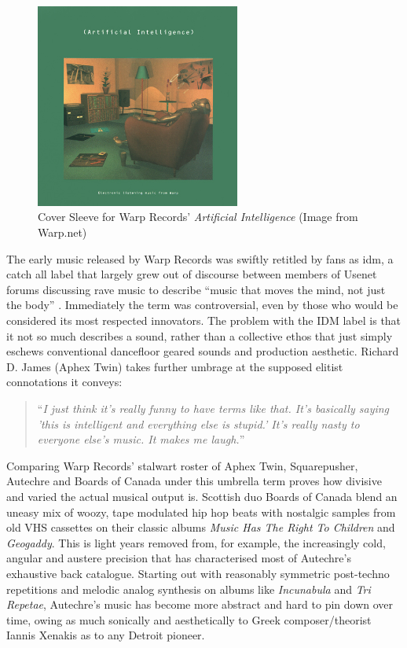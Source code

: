 \begin{figure}
	\begin{center}
		\includegraphics[width=0.6\textwidth]{ch02_dancemusic/figures/warp.jpg}
	\end{center}
	\caption[Cover Sleeve for \textit{Artificial Intelligence} (Warp Records)]{Cover Sleeve for Warp Records' \textit{Artificial Intelligence} (Image from Warp.net)}
	\label{fig:roland}
\end{figure}

The early music released by Warp Records was swiftly retitled by fans as \acrfull{idm}, a catch all label that largely grew out of discourse between members of Usenet forums discussing rave music to describe “music that moves the mind, not just the body” \citep{Alwakeel2009}. Immediately the term was controversial, even by those who would be considered its most respected innovators.  The problem with the IDM label is that it not so much describes a sound, rather than a collective ethos that just simply eschews conventional dancefloor geared sounds and production aesthetic. Richard D. James (Aphex Twin) takes further umbrage at the supposed elitist connotations it conveys:

\blockcquote[]{Haworth2015}{``\textit{I just think it's really funny to have terms like that. It's basically saying 'this is intelligent and everything else is stupid.' It's really nasty to everyone else's music. It makes me laugh.}''}

Comparing Warp Records’ stalwart roster of Aphex Twin, Squarepusher, Autechre and Boards of Canada under this umbrella term proves how divisive and varied the actual musical output is. Scottish duo Boards of Canada blend an uneasy mix of woozy, tape modulated hip hop beats with nostalgic samples from old VHS cassettes on their classic albums \textit{Music Has The Right To Children} and \textit{Geogaddy}. This is light years removed from, for example, the increasingly cold, angular and austere precision that has characterised most of Autechre’s exhaustive back catalogue. Starting out with reasonably symmetric post-techno repetitions and melodic analog synthesis on albums like \textit{Incunabula} and \textit{Tri Repetae}, Autechre’s music has become more abstract and hard to pin down over time, owing as much sonically and aesthetically to Greek composer/theorist Iannis Xenakis as to any Detroit pioneer.

